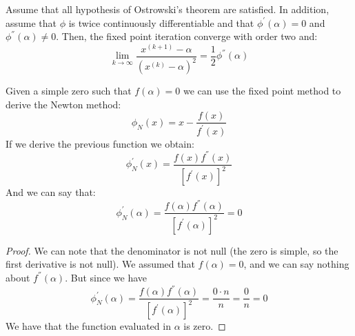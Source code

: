 \begin{proposition}
    Assume that all hypothesis of Ostrowski's theorem are satisfied. In addition, assume that $\phi$ is twice continuously differentiable and that $\phi^{'}(\alpha)=0$ and 
    $\phi^{''}(\alpha) \neq 0$. Then, the fixed point iteration converge with order two and:
    \[\lim_{k \rightarrow \infty}\dfrac{x^{(k+1)}-\alpha}{\left(x^{(k)}-\alpha\right)^2}=\dfrac{1}{2}\phi^{''}(\alpha)\]
\end{proposition}
Given a simple zero such that $f(\alpha)=0$ we can use the fixed point method to derive the Newton method: 
\[\phi_N(x)=x-\dfrac{f(x)}{f^{'}(x)}\]
If we derive the previous function we obtain:
\[\phi^{'}_N(x)=\dfrac{f(x)f^{''}(x)}{\left[f^{'}(x)\right]^2}\]
And we can say that: 
\[\phi^{'}_N(\alpha)=\dfrac{f(\alpha)f^{''}(\alpha)}{\left[f^{'}(\alpha)\right]^2}=0\]
\begin{proof}
    We can note that the denominator is not null (the zero is simple, so the first derivative is not null). We assumed that $f(\alpha)=0$, and we can say nothing about 
    $f^{''}(\alpha)$. But since we have 
    \[\phi^{'}_N(\alpha)=\dfrac{f(\alpha)f^{''}(\alpha)}{\left[f^{'}(\alpha)\right]^2}=\dfrac{0 \cdot n}{n}=\dfrac{0}{n}=0\]
    We have that the function evaluated in $\alpha$ is zero. 
\end{proof}

